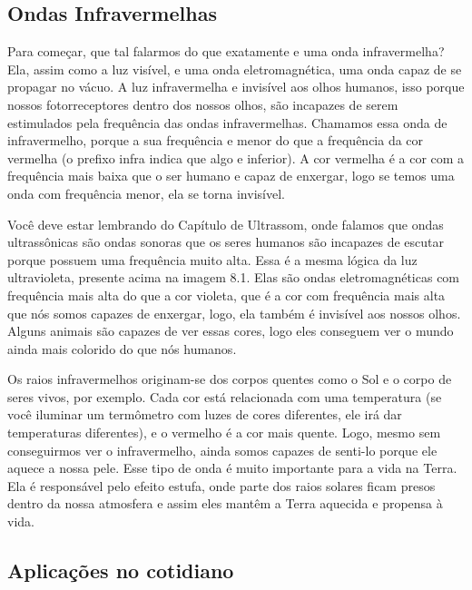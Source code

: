 \documentclass[conference]{IEEEtran}
\begin{document}
\begin{center}
    \subsection{Ondas Infravermelhas}
\end{center}
\par
Para começar, que tal falarmos do que exatamente e uma onda infravermelha? Ela, assim como a luz visível, e uma onda eletromagnética, uma onda capaz de se propagar no vácuo. A luz infravermelha e invisível aos olhos humanos, isso porque nossos fotorreceptores dentro dos nossos olhos, são incapazes de serem estimulados pela frequência das ondas infravermelhas. Chamamos essa onda de infravermelho, porque a sua frequência e menor do que a frequência da cor vermelha (o prefixo infra indica que algo e inferior). A cor vermelha é a cor com a frequência mais baixa que o ser humano e capaz de enxergar, logo se temos uma onda com frequência menor, ela se torna invisível.
\par
Você deve estar lembrando do Capítulo de Ultrassom, onde falamos que ondas ultrassônicas são ondas sonoras que os seres humanos são incapazes de escutar porque possuem uma frequência muito alta. Essa é a mesma lógica da luz ultravioleta, presente acima na imagem 8.1. Elas são ondas eletromagnéticas com frequência mais alta do que a cor violeta, que é a cor com frequência mais alta que nós somos capazes de enxergar, logo, ela também é invisível aos nossos olhos. Alguns animais são capazes de ver essas cores, logo eles conseguem ver o mundo ainda mais colorido do que nós humanos. 
\par
Os raios infravermelhos originam-se dos corpos quentes como o Sol e o corpo de seres vivos, por exemplo. Cada cor está relacionada com uma temperatura (se você iluminar um termômetro com luzes de cores diferentes, ele irá dar temperaturas diferentes), e o vermelho é a cor mais quente. Logo, mesmo sem conseguirmos ver o infravermelho, ainda somos capazes de senti-lo porque ele aquece a nossa pele. Esse tipo de onda é muito importante para a vida na Terra. Ela é responsável pelo efeito estufa, onde parte dos raios solares ficam presos dentro da nossa atmosfera e assim eles mantêm a Terra aquecida e propensa à vida.

\begin{center}
    \subsection{Aplicações no cotidiano}
\end{center}
\end{document}

